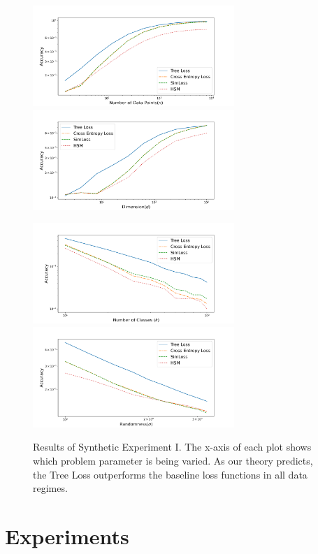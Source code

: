 \documentclass[twoside]{article}
\begin{document}

\begin{figure}
    \centering 

\includegraphics[width=\columnwidth,height=1.5in]{fig/images/accuracy_vs_n.png}
\includegraphics[width=\columnwidth,height=1.5in]{fig/images/accuracy_vs_d.png}

\includegraphics[width=\columnwidth,height=1.5in]{fig/images/accuracy_vs_class.png}
\includegraphics[width=\columnwidth,height=1.5in]{fig/images/accuracy_vs_sigma.png}
\caption{
    Results of Synthetic Experiment I.
    The x-axis of each plot shows which problem parameter is being varied.
    As our theory predicts, the Tree Loss outperforms the baseline loss functions in all data regimes.
}
\label{fig:synth:1}
\end{figure}

\section{Experiments}
\label{sec:experiment}
\end{document}
